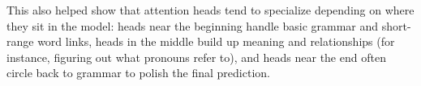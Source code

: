 This also helped show that attention heads tend to specialize depending on
where they sit in the model: heads near the beginning handle basic grammar and
short-range word links, heads in the middle build up meaning and relationships
(for instance, figuring out what pronouns refer to), and heads near the end
often circle back to grammar to polish the final prediction.





